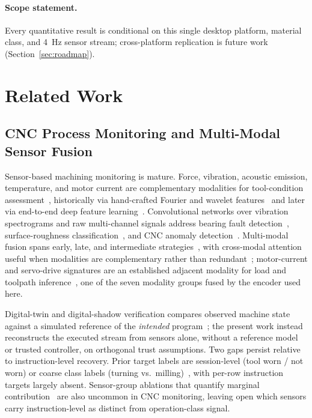 \documentclass[sensors,article,submit,moreauthors,pdftex]{Definitions/mdpi}
\begin{document}
\paragraph{Scope statement.} Every quantitative result is conditional on this single desktop platform, material class, and 4~Hz sensor stream; cross-platform replication is future work (Section~\ref{sec:roadmap}).

\section{Related Work}
\label{sec:related}

\subsection{CNC Process Monitoring and Multi-Modal Sensor Fusion}
\label{sec:related-cnc}

Sensor-based machining monitoring is mature. Force, vibration, acoustic emission, temperature, and motor current are complementary modalities for tool-condition assessment~\cite{teti2010advanced}, historically via hand-crafted Fourier and wavelet features~\cite{zhu2009wavelet,mohanraj2020tool} and later via end-to-end deep feature learning~\cite{wang2018deep,zhao2019machine}. Convolutional networks over vibration spectrograms and raw multi-channel signals address bearing fault detection~\cite{janssens2016convolutional}, surface-roughness classification~\cite{bhandari2021comparative,stathatos2024cnn}, and CNC anomaly detection~\cite{coelho2024anomaly}. Multi-modal fusion spans early, late, and intermediate strategies~\cite{lahat2015multimodal,ramachandram2017deep}, with cross-modal attention useful when modalities are complementary rather than redundant~\cite{cao2023crossattention,wang2024multisensor}; motor-current and servo-drive signatures are an established adjacent modality for load and toolpath inference~\cite{teti2010advanced,wang2018deep}, one of the seven modality groups fused by the encoder used here.

Digital-twin and digital-shadow verification compares observed machine state against a simulated reference of the \emph{intended} program~\cite{bergs2021digital}; the present work instead reconstructs the executed stream from sensors alone, without a reference model or trusted controller, on orthogonal trust assumptions. Two gaps persist relative to instruction-level recovery. Prior target labels are session-level (tool worn / not worn) or coarse class labels (turning vs.\ milling)~\cite{tsanousa2022multisensor}, with per-row instruction targets largely absent. Sensor-group ablations that quantify marginal contribution~\cite{meyes2019ablation,jia2016deep} are also uncommon in CNC monitoring, leaving open which sensors carry instruction-level as distinct from operation-class signal.
\end{document}
